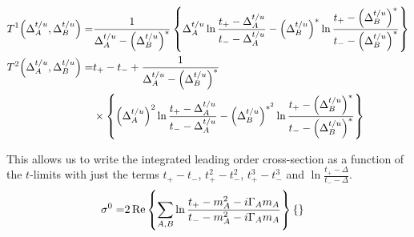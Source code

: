 \documentclass[../main.tex]{subfiles}
\begin{document}
\begin{subequations}
\begin{align}
		T^1\!\left(\Delta_A^{t/u}, \Delta_B^{t/u}\right) = & \frac{1}{\Delta_A^{t/u} - \left(\Delta_B^{t/u}\right)^\ast} \left\{\Delta_A^{t/u} \ln\frac{t_+ - \Delta_A^{t/u}}{t_- - \Delta_A^{t/u}} - \left(\Delta_B^{t/u}\right)^\ast \ln\frac{t_+ - \left(\Delta_B^{t/u}\right)^\ast}{t_- - \left(\Delta_B^{t/u}\right)^\ast}\right\} \\
		\nonumber
		T^2\!\left(\Delta_A^{t/u}, \Delta_B^{t/u}\right) = & t_+ - t_- + \frac{1}{\Delta_A^{t/u} - \left(\Delta_B^{t/u}\right)^\ast}                                                                                                                                                                                      \\
		                                                & \times \left\{\left(\Delta_A^{t/u}\right)^2 \ln\frac{t_+ - \Delta_A^{t/u}}{t_- - \Delta_A^{t/u}} - \left(\Delta_B^{t/u}\right)^{\ast^2} \ln\frac{t_+ - \left(\Delta_B^{t/u}\right)^\ast}{t_- - \left(\Delta_B^{t/u}\right)^\ast}\right\}
	\end{align}
\end{subequations}

This allows us to write the integrated leading order cross-section as a function of the \(t\)-limits with just the terms \(t_+-t_-\), \(t_+^2-t_-^2\), \(t_+^3-t_-^3\) and \(\ln\frac{t_+-\Delta}{t_--\Delta}\).
\begin{align}
	\sigma^0 = & 2\operatorname{Re}\left\{\sum_{A,B} \ln\frac{t_+ - m_A^2 - i\Gamma_A m_A}{t_- - m_A^2 - i\Gamma_A m_A}\right\} \left\{\right\}
\end{align}
\end{document}
